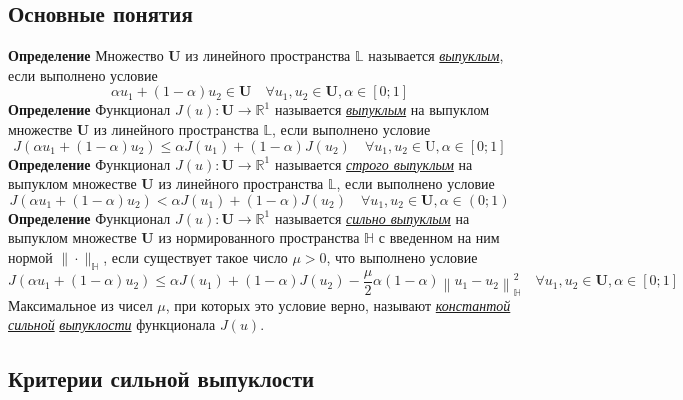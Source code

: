 \documentclass[A4]{article}
\begin{document}
\subsection{Основные понятия}
\textbf{Определение} Множество $\mathbf{U}$ из линейного пространства  $\mathbb{L}$ называется \underline{\emph{выпуклым}}, если выполнено условие
\begin{equation*}
\alpha u_{1}+(1-\alpha) u_{2} \in \mathbf{U} \quad \forall u_{1}, u_{2} \in \mathbf{U}, \alpha \in[0 ; 1]
\end{equation*}
\textbf{Определение} Функционал $ J(u): \mathbf{U} \rightarrow \mathbb{R}^{1}$  называется \underline{\emph{выпуклым}} на выпуклом множестве $ \mathbf{U} $ из линейного пространства $ \mathbb{L}$,  если выполнено условие
\begin{equation*}
J\left(\alpha u_{1}+(1-\alpha) u_{2}\right) \leqslant \alpha J\left(u_{1}\right)+(1-\alpha) J\left(u_{2}\right) \quad \forall u_{1}, u_{2} \in \mathrm{U}, \alpha \in[0 ; 1]
\end{equation*}
\textbf{Определение} Функционал $J(u): \mathbf{U} \rightarrow \mathbb{R}^{1} $ называется \underline{\emph{строго выпуклым}} на выпуклом множестве $\mathbf{U}$ из линейного пространства $ \mathbb{L}$,  если выполнено условие
\begin{equation*}
J\left(\alpha u_{1}+(1-\alpha) u_{2}\right)<\alpha J\left(u_{1}\right)+(1-\alpha) J\left(u_{2}\right) \quad \forall u_{1}, u_{2} \in \mathbf{U}, \alpha \in(0 ; 1)
\end{equation*}
\textbf{Определение} Функционал $J(u): \mathbf{U} \rightarrow \mathbb{R}^{1} $ называется \underline{\emph{сильно выпуклым}} на выпуклом множестве $\mathbf{U}$ из нормированного пространства $ \mathbb{H}$ с введенном на ним нормой  $\|\cdot\|_{\mathbb{H}}$,  если существует такое число $ \mu>0$,  что выполнено условие
\begin{equation*}
J\left(\alpha u_{1}+(1-\alpha) u_{2}\right) \leqslant \alpha J\left(u_{1}\right)+(1-\alpha) J\left(u_{2}\right)-\frac{\mu}{2} \alpha(1-\alpha)\left\|u_{1}-u_{2}\right\|_{\mathbb{H}}^{2} \quad \forall u_{1}, u_{2} \in \mathbf{U}, \alpha \in[0 ; 1]
\end{equation*}
Максимальное из чисел $ \mu$,  при которых это условие верно, называют \underline{\emph{константой сильной}} \underline{\emph{выпуклости}} функционала $ J(u)$. 
\subsection{Критерии сильной выпуклости}
\end{document}
